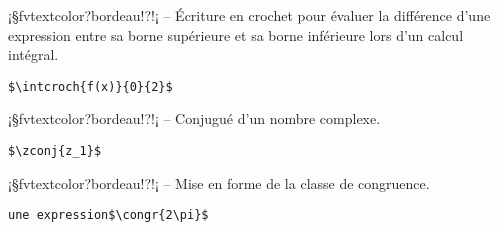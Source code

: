 \documentclass[11pt,a4paper,rgb]{report}
\begin{document}
\setlength{\leftskip}{0pt}
\setlength{\textwidth}{18cm}%


\vspace*{.75cm}

\inCodeStub¡§fvtextcolor?bordeau!?!¡ -- Écriture en crochet pour évaluer la différence d'une expression entre sa borne supérieure et sa borne inférieure lors d'un calcul intégral.

\setlength{\leftskip}{.75cm}%
\setlength{\textwidth}{17.25cm}%

\colorbox{blue!15}{}
\hfill
\begin{minipage}{.65\textwidth}
	\begin{lstlisting}[linewidth=\textwidth, language={[LaTeX]TeX}]
	$\intcroch{f(x)}{0}{2}$
	\end{lstlisting}
\end{minipage}

\setlength{\leftskip}{0pt}
\setlength{\textwidth}{18cm}%


\vspace*{.75cm}

\inCodeStub¡§fvtextcolor?bordeau!?!¡ -- Conjugué d'un nombre complexe.

\setlength{\leftskip}{.75cm}%
\setlength{\textwidth}{17.25cm}%

\colorbox{blue!15}{}
\hfill
\begin{minipage}{.65\textwidth}
	\begin{lstlisting}[linewidth=\textwidth, language={[LaTeX]TeX}]
	$\zconj{z_1}$
	\end{lstlisting}
\end{minipage}

\setlength{\leftskip}{0pt}
\setlength{\textwidth}{18cm}%


\vspace*{.75cm}

\inCodeStub¡§fvtextcolor?bordeau!?!¡ -- Mise en forme de la classe de congruence.

\setlength{\leftskip}{.75cm}%
\setlength{\textwidth}{17.25cm}%

\colorbox{blue!15}{}
\hfill
\begin{minipage}{.65\textwidth}
	\begin{lstlisting}[linewidth=\textwidth, language={[LaTeX]TeX}]
	une expression$\congr{2\pi}$
	\end{lstlisting}
\end{minipage}
\end{document}
